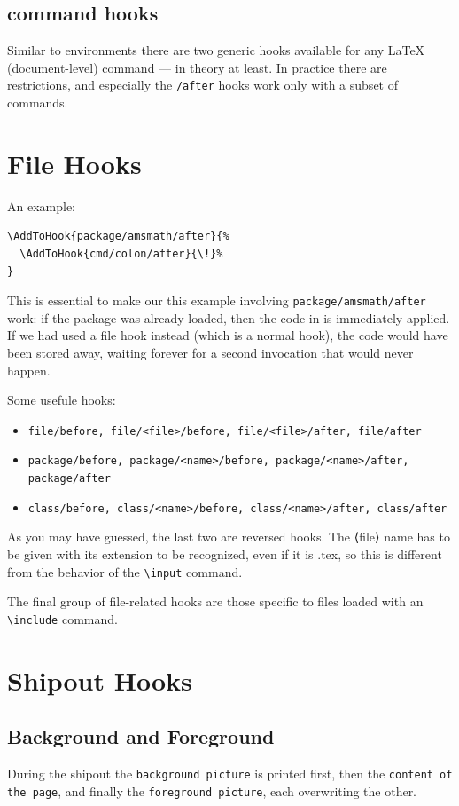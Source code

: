 \documentclass{article}
\newcommand\tbh{\textbackslash}
\begin{document}
\subsection{command hooks}
Similar to environments there are two generic hooks available for any \LaTeX{} (document-level) command — in theory at least. 
In practice there are restrictions, and especially the \texttt{/after} hooks work only with a subset of commands.

\section{File Hooks}
An example:
\begin{lstlisting}
\AddToHook{package/amsmath/after}{%
  \AddToHook{cmd/colon/after}{\!}%
}
\end{lstlisting}
This is essential to make our this example involving \texttt{package/amsmath/after} work: if
the package was already loaded, then the code in \AddToHook is immediately applied.
If we had used a file hook instead (which is a normal hook), the code would have
been stored away, waiting forever for a second invocation that would never happen.


Some usefule hooks:
\begin{itemize}
  \item \texttt{file/before, file/<file>/before, file/<file>/after, file/after}
  \item \texttt{package/before, package/<name>/before, package/<name>/after, package/after}
  \item \texttt{class/before, class/<name>/before, class/<name>/after, class/after}
\end{itemize}
As you may have guessed, the last two
are reversed hooks. The ⟨file⟩ name has to be given with its extension to be recognized,
even if it is .tex, so this is different from the behavior of the \texttt{\tbh input} command.

The final group of file-related hooks are those specific to files loaded with an
\texttt{\tbh include} command. 


\section{Shipout Hooks}
\subsection{Background and Foreground}
During the shipout the \texttt{background picture} is printed first, then the
\texttt{content of the page}, and finally the \texttt{foreground picture}, each overwriting the other.
\end{document}
